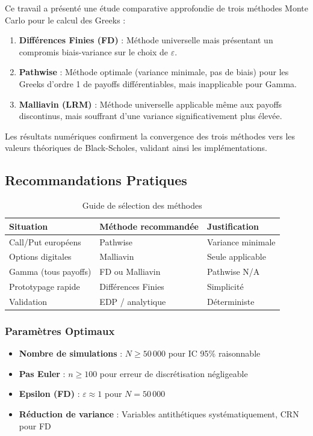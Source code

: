 \documentclass[a4paper,11pt]{article}
\theoremstyle{definition}
\begin{document}
Ce travail a présenté une étude comparative approfondie de trois méthodes Monte Carlo pour le calcul des Greeks :

\begin{enumerate}
    \item \textbf{Différences Finies (FD)} : Méthode universelle mais présentant un compromis biais-variance sur le choix de $\varepsilon$.
    
    \item \textbf{Pathwise} : Méthode optimale (variance minimale, pas de biais) pour les Greeks d'ordre 1 de payoffs différentiables, mais inapplicable pour Gamma.
    
    \item \textbf{Malliavin (LRM)} : Méthode universelle applicable même aux payoffs discontinus, mais souffrant d'une variance significativement plus élevée.
\end{enumerate}

Les résultats numériques confirment la convergence des trois méthodes vers les valeurs théoriques de Black-Scholes, validant ainsi les implémentations.

\subsection{Recommandations Pratiques}

\begin{table}[H]
\centering
\begin{tabular}{lll}
\toprule
\textbf{Situation} & \textbf{Méthode recommandée} & \textbf{Justification} \\
\midrule
Call/Put européens & Pathwise & Variance minimale \\
Options digitales & Malliavin & Seule applicable \\
Gamma (tous payoffs) & FD ou Malliavin & Pathwise N/A \\
Prototypage rapide & Différences Finies & Simplicité \\
Validation & EDP / analytique & Déterministe \\
\bottomrule
\end{tabular}
\caption{Guide de sélection des méthodes}
\end{table}

\subsubsection{Paramètres Optimaux}

\begin{itemize}
    \item \textbf{Nombre de simulations} : $N \geq 50\,000$ pour IC 95\% raisonnable
    \item \textbf{Pas Euler} : $n \geq 100$ pour erreur de discrétisation négligeable
    \item \textbf{Epsilon (FD)} : $\varepsilon \approx 1$ pour $N = 50\,000$
    \item \textbf{Réduction de variance} : Variables antithétiques systématiquement, CRN pour FD
\end{itemize}
\end{document}
